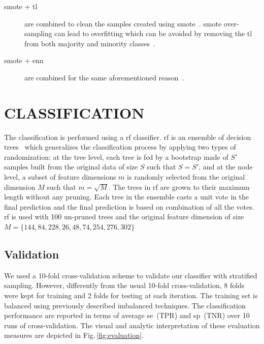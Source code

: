 \begin{description}
  \item[\ac{smote} + \ac{tl}] are combined to clean the samples created using \ac{smote}~\cite{batista2003balancing}.
\ac{smote} over-sampling can lead to overfitting which can be avoided by removing the \ac{tl} from both majority and minority classes~\cite{prati2009data}.
  \item[\ac{smote} + \ac{enn}] are combined for the same aforementioned reason~\cite{batista2004study}.
\end{description}

\section{\uppercase{Classification}}
\label{sec:clas-val}

\noindent The classification is performed using a \ac{rf} classifier.
\Ac{rf} is an ensemble of decision trees~\cite{breiman2001random} which generalizes the classification process by applying two types of randomization: at the tree level, each tree is fed by a bootstrap made of $S'$ samples built from the original data of size $S$ such that  $S=S'$, and at the node level, a subset of feature dimensions $m$ is randomly selected from the original dimension $M$ such that $m=\sqrt{M}$. 
The trees in \ac{rf} are grown to their maximum length without any pruning.
Each tree in the ensemble casts a unit vote in the final prediction and the final prediction is based on combination of all the votes. 
\Ac{rf} is used with 100 un-pruned trees and the original feature dimension of size $M=\{144,84,228,26,48,74,254,276,302\}$

\subsection{Validation}
We used a 10-fold cross-validation scheme to validate our classifier with stratified sampling.
However, differently from the usual 10-fold cross-validation, 8 folds were kept for training and 2 folds for testing at each iteration. 
The training set is balanced using previously described imbalanced techniques. 
The classification performance are reported in terms of average \ac{se}~(TPR) and \ac{sp}~(TNR) over 10 runs of cross-validation. 
The visual and analytic interpretation of these evaluation measures are depicted in Fig.\,\ref{fig:evaluation}.

